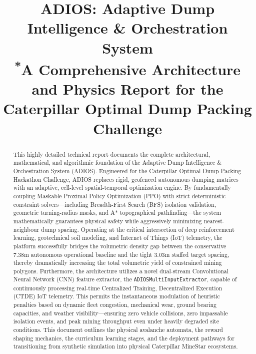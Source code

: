\documentclass[conference]{IEEEtran}
\begin{document}
\title{ADIOS: Adaptive Dump Intelligence \& Orchestration System\\
{\footnotesize \textsuperscript{*}A Comprehensive Architecture and Physics Report for the Caterpillar Optimal Dump Packing Challenge}
}

\author{
\and
{}
\and
{}
\and
{}
}

\maketitle

\begin{abstract}
This highly detailed technical report documents the complete architectural, mathematical, and algorithmic foundation of the Adaptive Dump Intelligence \& Orchestration System (ADIOS). Engineered for the Caterpillar Optimal Dump Packing Hackathon Challenge, ADIOS replaces rigid, geofenced autonomous dumping matrices with an adaptive, cell-level spatial-temporal optimization engine. By fundamentally coupling Maskable Proximal Policy Optimization (PPO) with strict deterministic constraint solvers—including Breadth-First Search (BFS) isolation validation, geometric turning-radius masks, and A* topographical pathfinding—the system mathematically guarantees physical safety while aggressively minimizing nearest-neighbour dump spacing. Operating at the critical intersection of deep reinforcement learning, geotechnical soil modeling, and Internet of Things (IoT) telemetry, the platform successfully bridges the volumetric density gap between the conservative 7.38m autonomous operational baseline and the tight 3.03m staffed target spacing, thereby dramatically increasing the total volumetric yield of constrained mining polygons. Furthermore, the architecture utilizes a novel dual-stream Convolutional Neural Network (CNN) feature extractor, the \texttt{ADIOSMultiInputExtractor}, capable of continuously processing real-time Centralized Training, Decentralized Execution (CTDE) IoT telemetry. This permits the instantaneous modulation of heuristic penalties based on dynamic fleet congestion, mechanical wear, ground bearing capacities, and weather visibility—ensuring zero vehicle collisions, zero impassable isolation events, and peak mining throughput even under heavily degraded site conditions. This document outlines the physical avalanche automata, the reward shaping mechanics, the curriculum learning stages, and the deployment pathways for transitioning from synthetic simulation into physical Caterpillar MineStar ecosystems.
\end{abstract}
\end{document}
